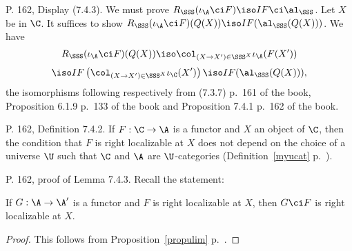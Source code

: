 \documentclass[12pt]{article}
\theoremstyle{remark}
\theoremstyle{definition}
\begin{document}

\begin{s}
P. 162, Display (7.4.3). We must prove $R_\SSS(\iota_\A\ci F)\iso IF\ci\al_\SSS$. Let $X$ be in $\C$. It suffices to show $R_\SSS(\iota_\A\ci F)(Q(X))\iso IF(\al_\SSS(Q(X)))$. We have 
$$
R_\SSS(\iota_\A\ci F)(Q(X))\iso\col_{(X\to X')\in\SSS^X}\iota_\A(F(X'))
$$ 
$$
\iso IF\left(\col_{(X\to X')\in\SSS^X}\iota_\C(X')\right)\iso IF(\al_\SSS(Q(X))),
$$ 
the isomorphisms following respectively from (7.3.7) p.~161 of the book, Proposition 6.1.9 p.~133 of the book and Proposition 7.4.1 p.~162 of the book.
\end{s}

%

\begin{s}
P. 162, Definition 7.4.2. If $F:\C\to\A$ is a functor and $X$ an object of $\C$, then the condition that $F$ is right localizable at $X$ does not depend on the choice of a universe $\U$ such that $\C$ and $\A$ are $\U$-categories (Definition~\ref{myucat} p.~).
\end{s}

%

\begin{s}
P. 162, proof of Lemma 7.4.3. Recall the statement:
\begin{lem}[Lemma 7.4.3 p. 162]
If $G:\A\to\A'$ is a functor and $F$ is right localizable at $X$, then $G\ci F$ is right localizable at $X$.
\end{lem}
\begin{proof}
This follows from Proposition~\ref{propulim} p.~.
\end{proof}
\end{s}

\end{document}
